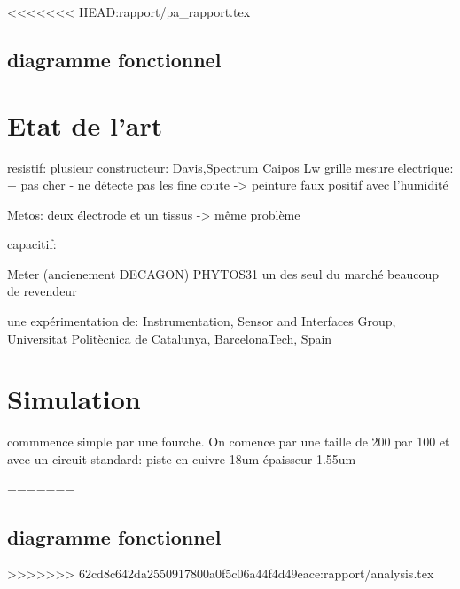 <<<<<<< HEAD:rapport/pa_rapport.tex
\subsection{diagramme fonctionnel}

\section{Etat de l'art}
resistif:
plusieur constructeur:
Davis,Spectrum Caipos Lw
grille mesure electrique:
+ pas cher
- ne détecte pas les fine coute -> peinture
faux positif avec l'humidité

Metos: deux électrode et un tissus -> même problème

capacitif:

Meter (ancienement DECAGON) PHYTOS31 
un des seul du marché beaucoup de revendeur

une expérimentation de: Instrumentation, Sensor and Interfaces Group, Universitat Politècnica de Catalunya, BarcelonaTech, Spain

\section{Simulation}

commmence simple par une fourche. On comence par une taille de 200 par 100 et avec un circuit standard: piste en cuivre 18um  épaisseur 1.55um 





=======
\subsection{diagramme fonctionnel} 
>>>>>>> 62cd8c642da2550917800a0f5c06a44f4d49eace:rapport/analysis.tex
